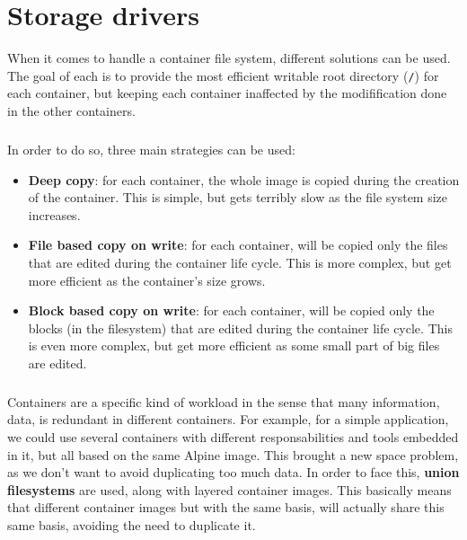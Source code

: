 \chapter{Storage drivers}
When it comes to handle a container file system, different solutions can be used.  The goal of each is to provide the most efficient writable root directory (\texttt{/}) for each container, but keeping each container inaffected by the modifification done in the other containers.

\paragraph{}In order to do so, three main strategies can be used:
\begin{itemize}
\renewcommand\labelitemi{--}
  \item \textbf{Deep copy}: for each container, the whole image is copied during the creation of the container.  This is simple, but gets terribly slow as the file system size increases.
  \item \textbf{File based copy on write}: for each container, will be copied only the files that are edited during the container life cycle.  This is more complex, but get more efficient as the container's size grows.
  \item \textbf{Block based copy on write}: for each container, will be copied only the blocks (in the filesystem) that are edited during the container life cycle.  This is even more complex, but get more efficient as some small part of big files are edited.
\end{itemize}

\paragraph{}Containers are a specific kind of workload in the sense that many information, data, is redundant in different containers.  For example, for a simple application, we could use several containers with different responsabilities and tools embedded in it, but all based on the same Alpine image.  This brought a new space problem, as we don't want to avoid duplicating too much data.  In order to face this, \textbf{union filesystems} are used, along with layered container images.  This basically means that different container images but with the same basis, will actually share this same basis, avoiding the need to duplicate it.

